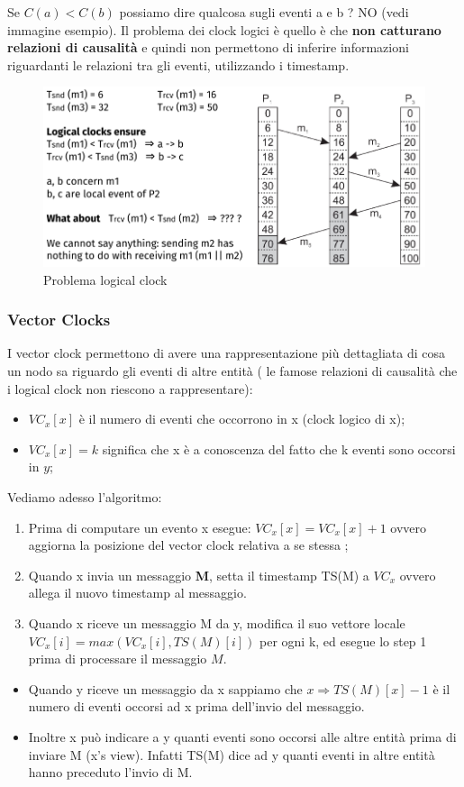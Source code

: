 \documentclass[12pt]{article}
\begin{document}
    		Se $C(a)<C(b)$ possiamo dire qualcosa sugli eventi a e b ? NO (vedi immagine esempio). Il problema dei clock logici è quello è che \textbf{non catturano relazioni di causalità} e quindi non permettono di inferire informazioni riguardanti le relazioni tra gli eventi, utilizzando i timestamp.
    		\begin{figure}[h!]
    			\centering
    			\includegraphics[scale=0.4]{img/lampex.png}
    			\caption{Problema logical clock}
    		\end{figure}
    	\subsubsection{Vector Clocks}
    		I vector clock permettono di avere una rappresentazione più dettagliata di cosa un nodo sa riguardo gli eventi di altre entità ( le famose relazioni di causalità che i logical clock non riescono a rappresentare):
    		\begin{itemize}
    			\item $VC_x[x]$ è il numero di eventi che occorrono in x (clock logico di x);
    			\item $VC_x[x]=k$ significa che x è a conoscenza del fatto che k eventi sono occorsi in $y$;
    		\end{itemize}
    		Vediamo adesso l'algoritmo:
    		\begin{enumerate}
    			\item Prima di computare un evento x esegue: $VC_x[x] = VC_x[x]+1$ ovvero aggiorna la posizione del vector clock relativa a se stessa ;
    			\item Quando x invia un messaggio \textbf{M}, setta il timestamp TS(M) a $VC_x$ ovvero allega il nuovo timestamp al messaggio.
    			\item Quando x riceve un messaggio M da y, modifica il suo vettore locale $VC_x[i] = max(VC_x[i],TS(M)[i])$ per ogni k, ed esegue lo step 1 prima di processare il messaggio $M$.
    		\end{enumerate}
    		\begin{itemize}
    			\item Quando y riceve un messaggio da x sappiamo che $x \Rightarrow TS(M)[x]-1$ è il numero di eventi occorsi ad x prima dell'invio del messaggio.
    			\item Inoltre x può indicare a y quanti eventi sono occorsi alle altre entità prima di inviare M (x's view). Infatti TS(M) dice ad y quanti eventi in altre entità hanno preceduto l'invio di M.
    		\end{itemize}
    	
\end{document}
